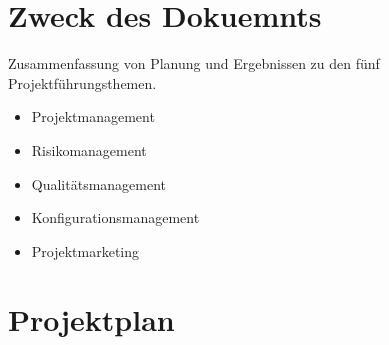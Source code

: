 \documentclass[10pt,paper=a4,final]{scrartcl}
\begin{document}
\section{Zweck des Dokuemnts}
Zusammenfassung von Planung und Ergebnissen zu den fünf Projektführungsthemen.
\begin{itemize}
  \item Projektmanagement
  \item Risikomanagement
  \item Qualitätsmanagement
  \item Konfigurationsmanagement
  \item Projektmarketing
\end{itemize}
\section{Projektplan}
\newpage
\end{document}
